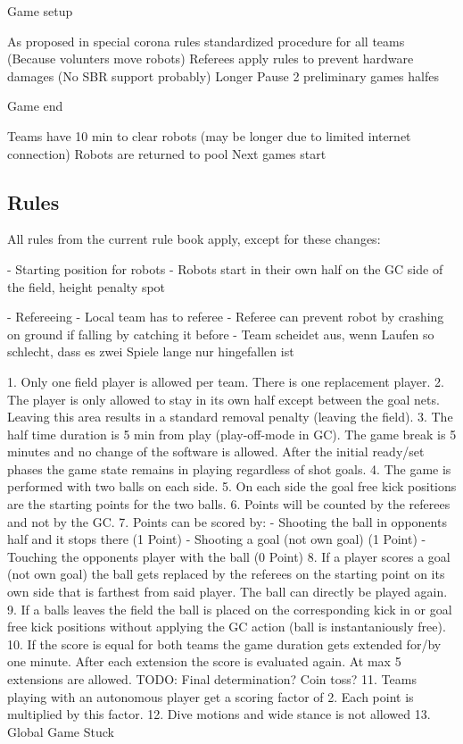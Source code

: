 Game setup

    As proposed in special corona rules
    standardized procedure for all teams (Because volunters move robots)
    Referees apply rules to prevent hardware damages (No SBR support probably)
    Longer Pause
    2 preliminary games halfes

Game end

    Teams have 10 min to clear robots (may be longer due to limited internet connection)
    Robots are returned to pool
    Next games start



\subsection{Rules}
All rules from the current rule book apply, except for these changes:

- Starting position for robots
    - Robots start in their own half on the GC side of the field, height penalty spot

- Refereeing
    - Local team has to referee
    - Referee can prevent robot by crashing on ground if falling by catching it before
    - Team scheidet aus, wenn Laufen so schlecht, dass es zwei Spiele lange nur hingefallen ist

1. Only one field player is allowed per team. There is one replacement player.
2. The player is only allowed to stay in its own half except between the goal nets. Leaving this area results in a standard removal penalty (leaving the field).
3. The half time duration is 5 min from play (play-off-mode in GC). The game break is 5 minutes and no change of  the software is allowed. After the initial ready/set phases the game state remains in playing regardless of shot goals.
4. The game is performed with two balls on each side.
5. On each side the goal free kick positions are the starting points for the two balls.
6. Points will be counted by the referees and not by the GC.
7. Points can be scored by:
    - Shooting the ball in opponents half and it stops there (1 Point)
    - Shooting a goal (not own goal) (1 Point)
    - Touching the opponents player with the ball (0 Point)
8. If a player scores a goal (not own goal) the ball gets replaced by the referees on the starting point on its own side that is farthest from said player. The ball can directly be played again.
9. If a balls leaves the field the ball is placed on the corresponding kick in or goal free kick positions without applying the GC action (ball is instantaniously free).
10. If the score is equal for both teams the game duration gets extended for/by one minute. After each extension the score is evaluated again. At max 5 extensions are allowed. TODO: Final determination? Coin toss?
11. Teams playing with an autonomous player get a scoring factor of 2. Each point is multiplied by this factor.
12. Dive motions and wide stance is not allowed
13. Global Game Stuck

